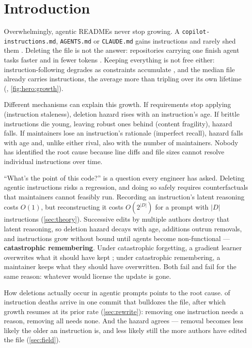 

\section{Introduction}
\label{sec:intro}

Overwhelmingly, agentic READMEs never stop growing. A \texttt{copilot-instructions.md},
\texttt{AGENTS.md} or \texttt{CLAUDE.md} gains instructions and rarely shed them
\citep{chatlatanagulchai2025agentreadmes}. Deleting the file is not the answer: repositories carrying one
finish agent tasks faster and in fewer tokens
\citep{lulla2026contextfiles}. Keeping everything is not free either: instruction-following degrades as
constraints accumulate \citep{jiang2024followbench, lior2025wildifeval}, and the median file already carries
\FieldOpMedian{} instructions, the average more than tripling over its own lifetime
(\FieldGrowthCountPeakPct{}, \autoref{fig:hero:growth}).

Different mechanisms can explain this growth. If requirements stop applying (instruction staleness), deletion
hazard rises with an instruction's age. If brittle instructions die young, leaving robust ones behind (content
fragility), hazard falls. If maintainers lose an instruction's rationale (imperfect recall), hazard falls
with age and, unlike either rival, also with the number of maintainers. Nobody has identified the root cause
because line diffs and file sizes cannot resolve individual instructions over time.

``What's the point of this code?'' is a question every engineer has asked. Deleting agentic
instructions risks a regression, and doing so safely requires counterfactuals that maintainers cannot
feasibly run. Recording an instruction's latent reasoning costs $O(1)$, but reconstructing
it costs $O(2^{|D|})$ for a prompt with $|D|$ instructions (\autoref{sec:theory}). Successive edits by
multiple authors destroy that latent reasoning, so deletion hazard decays with age, additions outrun
removals, and instructions grow without bound until agents become non-functional --- \textbf{catastrophic
remembering}. Under catastrophic forgetting, a gradient learner overwrites what it should have kept
\citep{mccloskey1989catastrophic, french1999catastrophic, kirkpatrick2017overcoming}; under catastrophic
remembering, a maintainer keeps what they should have overwritten. Both fail and fail for the same reason:
whatever would license the update is gone.

How deletions actually occur in agentic prompts points to the root cause. \RewriteDeathShare{} of instruction
deaths arrive in one commit that bulldozes the file, after which growth resumes at its prior rate
(\autoref{sec:rewrite}): removing one instruction needs a reason, removing all needs none. And the hazard agrees
--- removal becomes less likely the older an instruction is, and less likely still the more authors have
edited the file (\autoref{sec:field}).

